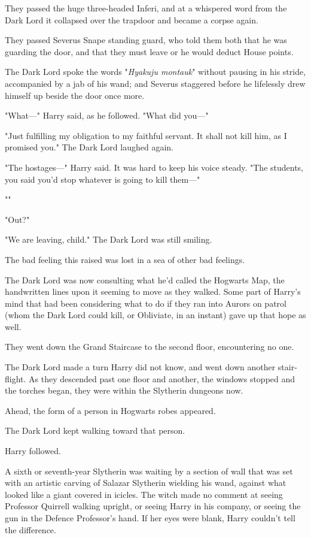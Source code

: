 They passed the huge three-headed Inferi, and at a whispered word from the Dark
Lord it collapsed over the trapdoor and became a corpse again.

They passed Severus Snape standing guard, who told them both that he was
guarding the door, and that they must leave or he would deduct House points.

The Dark Lord spoke the words "\emph{Hyakuju montauk}" without pausing in his
stride, accompanied by a jab of his wand; and Severus staggered before he
lifelessly drew himself up beside the door once more.

"What---" Harry said, as he followed. "What did you---"

"Just fulfilling my obligation to my faithful servant. It shall not kill him,
as I promised you." The Dark Lord laughed again.

"The hostages---" Harry said. It was hard to keep his voice steady. "The
students, you said you'd stop whatever is going to kill them---"

""

"Out?"

"We are leaving, child." The Dark Lord was still smiling.

The bad feeling this raised was lost in a sea of other bad feelings.

The Dark Lord was now consulting what he'd called the Hogwarts Map, the
handwritten lines upon it seeming to move as they walked. Some part of Harry's
mind that had been considering what to do if they ran into Aurors on patrol
(whom the Dark Lord could kill, or Obliviate, in an instant) gave up that hope
as well.

They went down the Grand Staircase to the second floor, encountering no one.

The Dark Lord made a turn Harry did not know, and went down another
stair-flight. As they descended past one floor and another, the windows stopped
and the torches began, they were within the Slytherin dungeons now.

Ahead, the form of a person in Hogwarts robes appeared.

The Dark Lord kept walking toward that person.

Harry followed.

A sixth or seventh-year Slytherin was waiting by a section of wall that was set
with an artistic carving of Salazar Slytherin wielding his wand, against what
looked like a giant covered in icicles. The witch made no comment at seeing
Professor Quirrell walking upright, or seeing Harry in his company, or seeing
the gun in the Defence Professor's hand. If her eyes were blank, Harry couldn't
tell the difference.

